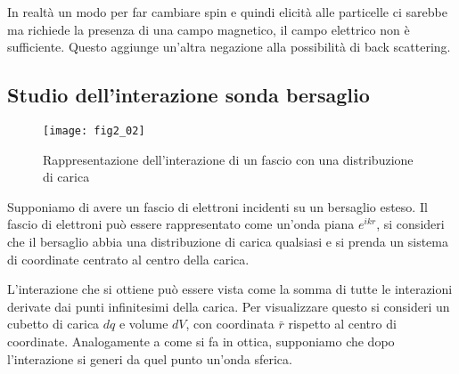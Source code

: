 In realtà un modo per far cambiare spin e quindi elicità alle particelle ci sarebbe ma richiede la presenza di una campo magnetico, il campo elettrico non è sufficiente. Questo aggiunge un'altra negazione alla possibilità di back scattering. 

\subsection{Studio dell'interazione sonda bersaglio}
\begin{figure}[h]
\centering
\texttt{[image: fig2\_02]}
\caption{Rappresentazione dell'interazione di un fascio con una distribuzione di carica}
\label{fig:2.02}
\end{figure}

Supponiamo di avere un fascio di elettroni incidenti su un bersaglio esteso.
Il fascio di elettroni può essere rappresentato come un'onda piana $e^{ikr}$, si consideri che il bersaglio abbia una distribuzione di carica qualsiasi e si prenda un sistema di coordinate centrato al centro della carica.

L'interazione che si ottiene può essere vista come la somma di tutte le interazioni derivate dai punti infinitesimi della carica. 
Per visualizzare questo si consideri un cubetto di carica $dq$ e volume $dV$, con coordinata $\bar r$ rispetto al centro di coordinate. 
Analogamente a come si fa in ottica, supponiamo che dopo l'interazione si generi da quel punto un'onda sferica.

